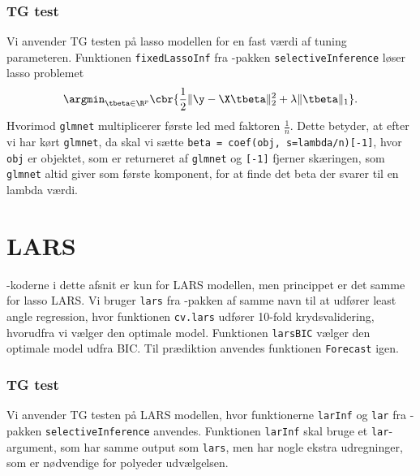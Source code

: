\subsubsection{TG test} 
Vi anvender TG testen på lasso modellen for en fast værdi af tuning parameteren. 
Funktionen \texttt{fixedLassoInf} fra \Rlang-pakken \texttt{selectiveInference}  løser lasso problemet
\begin{align*}
\argmin_{\tbeta \in \R^p} \cbr{\frac{1}{2} \Vert \y - \X \tbeta \Vert_2^2 + \lambda \Vert \tbeta \Vert_1}.
\end{align*}
Hvorimod \texttt{glmnet} multiplicerer første led med faktoren \(\frac{1}{n}\).
Dette betyder, at efter vi har kørt \texttt{glmnet}, da skal vi sætte \texttt{beta = coef(obj, s=lambda/n)[-1]}, hvor \texttt{obj} er objektet, som er returneret af \texttt{glmnet} og \texttt{[-1]} fjerner skæringen, som \texttt{glmnet} altid giver som første komponent, for at finde det beta der svarer til en lambda værdi.
%
%

\section{LARS} \label{sec:apprkoderlars}
\Rlang-koderne i dette afsnit er kun for LARS modellen, men princippet er det samme for lasso LARS.
Vi bruger \texttt{lars} fra  \Rlang-pakken af samme navn til at udfører least angle regression, hvor funktionen \texttt{cv.lars} udfører 10-fold krydsvalidering, hvorudfra vi vælger den optimale model. 
Funktionen \texttt{larsBIC} vælger den optimale model udfra BIC. 
Til prædiktion anvendes funktionen \texttt{Forecast} igen.

\subsubsection{TG test} \label{subsubsec:inferens}
Vi anvender TG testen på LARS modellen, hvor funktionerne \texttt{larInf} og \texttt{lar} fra \Rlang-pakken \texttt{selectiveInference} anvendes. 
Funktionen \texttt{larInf} skal bruge et \texttt{lar}-argument, som har samme output som \texttt{lars}, men har nogle ekstra udregninger, som er nødvendige for polyeder udvælgelsen. 




